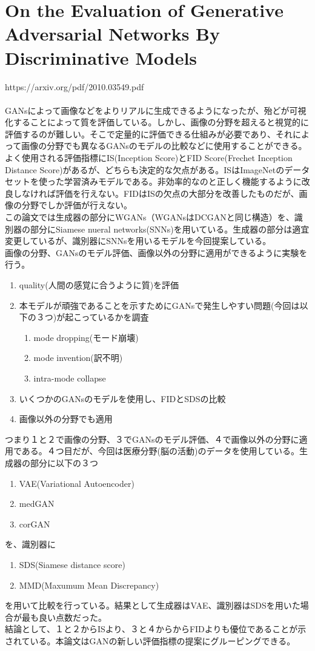 \documentclass[dvipdfmx]{jsarticle}
\begin{document}
\section{On the Evaluation of Generative Adversarial Networks By Discriminative Models}
\parindent=0pt https://arxiv.org/pdf/2010.03549.pdf
\\\\
GANsによって画像などをよりリアルに生成できるようになったが、殆どが可視化することによって質を評価している。しかし、画像の分野を超えると視覚的に評価するのが難しい。そこで定量的に評価できる仕組みが必要であり、それによって画像の分野でも異なるGANsのモデルの比較などに使用することができる。よく使用される評価指標にIS(Inception Score)とFID Score(Frechet Inception Distance Score)があるが、どちらも決定的な欠点がある。ISはImageNetのデータセットを使った学習済みモデルである。非効率的なのと正しく機能するように改良しなければ評価を行えない。FIDはISの欠点の大部分を改善したものだが、画像の分野でしか評価が行えない。
\\
この論文では生成器の部分にWGANs（WGANsはDCGANと同じ構造）を、識別器の部分にSiamese nueral networks(SNNs)を用いている。生成器の部分は適宜変更しているが、識別器にSNNsを用いるモデルを今回提案している。
\\
画像の分野、GANsのモデル評価、画像以外の分野に適用ができるように実験を行う。
\begin{enumerate}
\item quality(人間の感覚に合うように質)を評価
\item 本モデルが頑強であることを示すためにGANsで発生しやすい問題(今回は以下の３つ)が起こっているかを調査
  \begin{enumerate}
    \item mode dropping(モード崩壊)
    \item mode invention(訳不明)
    \item intra-mode collapse
  \end{enumerate}
\item いくつかのGANsのモデルを使用し、FIDとSDSの比較
\item 画像以外の分野でも適用
\end{enumerate}
つまり１と２で画像の分野、３でGANsのモデル評価、４で画像以外の分野に適用である。４つ目だが、今回は医療分野(脳の活動)のデータを使用している。生成器の部分に以下の３つ
\begin{enumerate}
\item VAE(Variational Autoencoder)
\item medGAN
\item corGAN
\end{enumerate}
を、識別器に
\begin{enumerate}
\item SDS(Siamese distance score)
\item MMD(Maxumum Mean Discrepancy)
\end{enumerate}
を用いて比較を行っている。結果として生成器はVAE、識別器はSDSを用いた場合が最も良い点数だった。
\\
結論として、１と２からISより、３と４からからFIDよりも優位であることが示されている。本論文はGANの新しい評価指標の提案にグルーピングできる。
\end{document}
